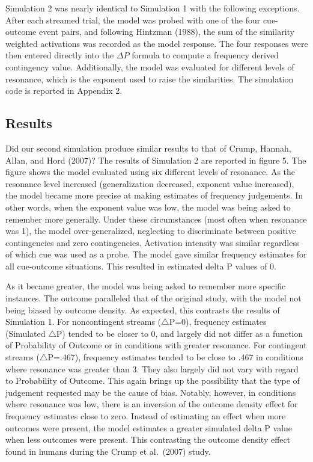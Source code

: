 \documentclass[
  english,
  man,floatsintext]{apa6}
\begin{document}
Simulation 2 was nearly identical to Simulation 1 with the following exceptions. After each streamed trial, the model was probed with one of the four cue-outcome event pairs, and following Hintzman (1988), the sum of the similarity weighted activations was recorded as the model response. The four responses were then entered directly into the \(\Delta P\) formula to compute a frequency derived contingency value. Additionally, the model was evaluated for different levels of resonance, which is the exponent used to raise the similarities. The simulation code is reported in Appendix 2.

\hypertarget{results-1}{%
\subsection{Results}\label{results-1}}

Did our second simulation produce similar results to that of Crump, Hannah, Allan, and Hord (2007)? The results of Simulation 2 are reported in figure 5. The figure shows the model evaluated using six different levels of resonance. As the resonance level increased (generalization decreased, exponent value increased), the model became more precise at making estimates of frequency judgements. In other words, when the exponent value was low, the model was being asked to remember more generally. Under these circumstances (most often when resonance was 1), the model over-generalized, neglecting to discriminate between positive contingencies and zero contingencies. Activation intensity was similar regardless of which cue was used as a probe. The model gave similar frequency estimates for all cue-outcome situations. This resulted in estimated delta P values of 0.

As it became greater, the model was being asked to remember more specific instances. The outcome paralleled that of the original study, with the model not being biased by outcome density. As expected, this contrasts the results of Simulation 1. For noncontingent streams (\(\triangle\)P=0), frequency estimates (Simulated \(\triangle\)P) tended to be closer to 0, and largely did not differ as a function of Probability of Outcome or in conditions with greater resonance. For contingent streams (\(\triangle\)P=.467), frequency estimates tended to be close to .467 in conditions where resonance was greater than 3. They also largely did not vary with regard to Probability of Outcome. This again brings up the possibility that the type of judgement requested may be the cause of bias. Notably, however, in conditions where resonance was low, there is an inversion of the outcome density effect for frequency estimates close to zero. Instead of estimating an effect when more outcomes were present, the model estimates a greater simulated delta P value when less outcomes were present. This contrasting the outcome density effect found in humans during the Crump et al.~(2007) study.
\end{document}
